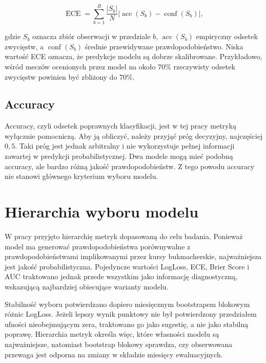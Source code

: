\begin{equation}
    \operatorname{ECE} = \sum_{b=1}^{B}\frac{|S_b|}{N}\left|\operatorname{acc}(S_b) - \operatorname{conf}(S_b)\right|,
\end{equation}

gdzie \(S_b\) oznacza zbiór obserwacji w przedziale \(b\), \(\operatorname{acc}(S_b)\) empiryczny odsetek zwycięstw, a \(\operatorname{conf}(S_b)\) średnie przewidywane prawdopodobieństwo. Niska wartość ECE oznacza, że predykcje modelu są dobrze skalibrowane. Przykładowo, wśród meczów ocenionych przez model na około \(70\%\) rzeczywisty odsetek zwycięstw powinien być zbliżony do \(70\%\).

\subsection{Accuracy}

Accuracy, czyli odsetek poprawnych klasyfikacji, jest w tej pracy metryką wyłącznie pomocniczą. Aby ją obliczyć, należy przyjąć próg decyzyjny, najczęściej \(0{,}5\). Taki próg jest jednak arbitralny i nie wykorzystuje pełnej informacji zawartej w predykcji probabilistycznej. Dwa modele mogą mieć podobną accuracy, ale bardzo różną jakość prawdopodobieństw. Z tego powodu accuracy nie stanowi głównego kryterium wyboru modelu.

\section{Hierarchia wyboru modelu}

W pracy przyjęto hierarchię metryk dopasowaną do celu badania. Ponieważ model ma generować prawdopodobieństwa porównywalne z prawdopodobieństwami implikowanymi przez kursy bukmacherskie, najważniejsza jest jakość probabilistyczna. Pojedyncze wartości LogLoss, ECE, Brier Score i AUC traktowano jednak przede wszystkim jako informację diagnostyczną, wskazującą najbardziej obiecujące warianty modelu.

Stabilność wyboru potwierdzano dopiero miesięcznym bootstrapem blokowym różnic LogLoss. Jeżeli lepszy wynik punktowy nie był potwierdzony przedziałem ufności nieobejmującym zera, traktowano go jako sugestię, a nie jako stabilną poprawę. Hierarchia metryk określa więc, które własności modelu są najważniejsze, natomiast bootstrap blokowy sprawdza, czy obserwowana przewaga jest odporna na zmiany w składzie miesięcy ewaluacyjnych.

